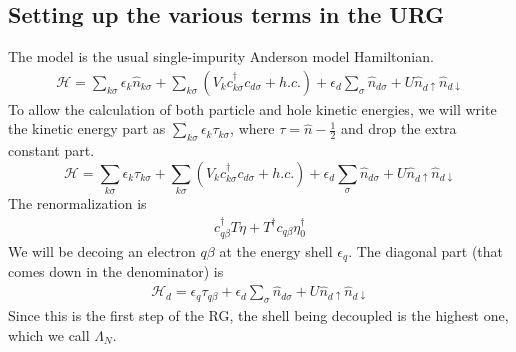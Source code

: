 \documentclass[twoside]{report}
\numberwithin{equation}{section}
\begin{document}
\subsection{Setting up the various terms in the URG}
The model is the usual single-impurity Anderson model Hamiltonian.
\begin{equation}\begin{aligned}
	\mathcal{H} = \sum_{k\sigma}\epsilon_k \hat n_{k\sigma} + \sum_{k\sigma} \left(V_{k} c^\dagger_{k\sigma} c_{d\sigma} + h.c.\right) + \epsilon_{d}\sum_\sigma  \hat n_{d\sigma} +  U \hat n_{d\uparrow} \hat n_{d\downarrow}
\end{aligned}\end{equation}
To allow the calculation of both particle and hole kinetic energies, we will write the kinetic energy part as \(\sum_{k\sigma}\epsilon_k \tau_{k\sigma}\), where \(\tau = \hat n - \frac{1}{2}\) and drop the extra constant part.
\begin{equation}
	\label{model:siam}
	\mathcal{H} = \sum_{k\sigma}\epsilon_k \tau_{k\sigma} + \sum_{k\sigma} \left(V_{k} c^\dagger_{k\sigma} c_{d\sigma} + h.c.\right) + \epsilon_{d}\sum_\sigma  \hat n_{d\sigma} +  U \hat n_{d\uparrow} \hat n_{d\downarrow}
\end{equation}
The renormalization is
\begin{equation}\begin{aligned}
\label{newh}
c^\dagger_{q\beta}T \eta + T^\dagger c_{q\beta}\eta_0^\dagger
\end{aligned}\end{equation}
We will be decoing an electron \(q\beta\) at the energy shell \(\epsilon_q\). The diagonal part (that comes down in the denominator) is
\begin{equation}\begin{aligned}
	\label{term1}
\mathcal{H}_d = \epsilon_q \tau_{q\beta} + \epsilon_{d}\sum_\sigma  \hat n_{d\sigma} +  U \hat n_{d\uparrow} \hat n_{d\downarrow}
\end{aligned}\end{equation}
Since this is the first step of the RG, the shell being decoupled is the highest one, which we call \(\Lambda_N\).
\end{document}
